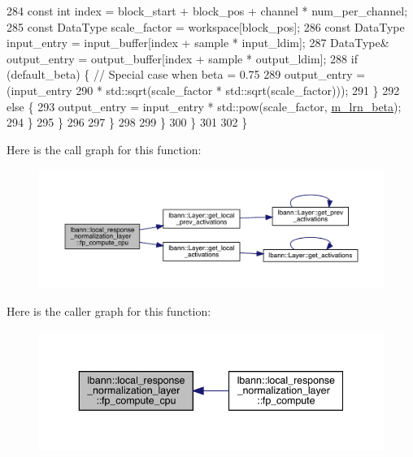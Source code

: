 \begin{DoxyCode}
284             \textcolor{keyword}{const} \textcolor{keywordtype}{int} index = block\_start + block\_pos + channel * num\_per\_channel;
285             \textcolor{keyword}{const} DataType scale\_factor = workspace[block\_pos];
286             \textcolor{keyword}{const} DataType input\_entry = input\_buffer[index + sample * input\_ldim];
287             DataType& output\_entry = output\_buffer[index + sample * output\_ldim];
288             \textcolor{keywordflow}{if} (default\_beta) \{ \textcolor{comment}{// Special case when beta = 0.75}
289               output\_entry = (input\_entry
290                               * std::sqrt(scale\_factor * std::sqrt(scale\_factor)));
291             \}
292             \textcolor{keywordflow}{else} \{
293               output\_entry = input\_entry * std::pow(scale\_factor, \hyperlink{classlbann_1_1local__response__normalization__layer_ad06848e9d59664be86aecbc1e2ba556f}{m\_lrn\_beta});
294             \}
295           \}
296 
297         \}
298 
299       \}
300     \}
301 
302   \}
\end{DoxyCode}
Here is the call graph for this function\+:\nopagebreak
\begin{figure}[H]
\begin{center}
\leavevmode
\includegraphics[width=350pt]{classlbann_1_1local__response__normalization__layer_a79c72491b5b74b64d2b10ac2636cddce_cgraph}
\end{center}
\end{figure}
Here is the caller graph for this function\+:\nopagebreak
\begin{figure}[H]
\begin{center}
\leavevmode
\includegraphics[width=343pt]{classlbann_1_1local__response__normalization__layer_a79c72491b5b74b64d2b10ac2636cddce_icgraph}
\end{center}
\end{figure}
\mbox{\label{classlbann_1_1local__response__normalization__layer_a715b08cfc4bfed730a066f6d9cedef86}} 
